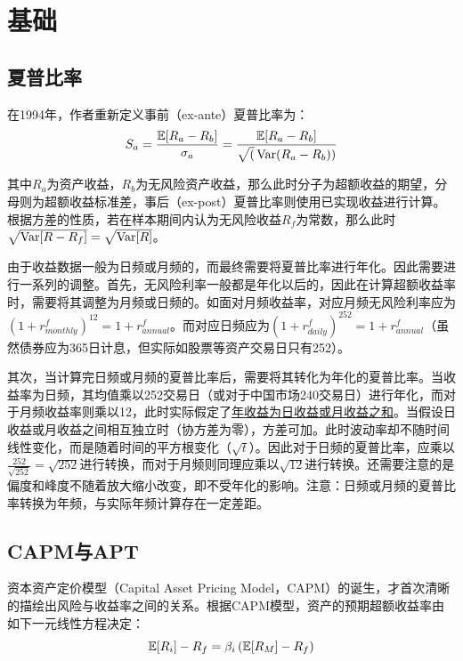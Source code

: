 \documentclass[11pt]{article}
\begin{document}
\maketitle
\tableofcontents

\section{基础}

\subsection{夏普比率}

在1994年，作者重新定义事前（ex-ante）夏普比率为：
\begin{equation*}
    S_a = \frac{\mathbb{E}[R_a-R_b]}{\sigma_a} = \frac{\mathbb{E}[R_a-R_b]}{\sqrt(\operatorname{Var} (R_a - R_b))}
\end{equation*}

其中$R_a$为资产收益，$R_b$为无风险资产收益，那么此时分子为超额收益的期望，分母则为超额收益标准差，事后（ex-post）夏普比率则使用已实现收益进行计算。根据方差的性质，若在样本期间内认为无风险收益$R_f$为常数，那么此时$\sqrt{\operatorname{Var}[R-R_f]} = \sqrt{\operatorname{Var}[R]}$。

由于收益数据一般为日频或月频的，而最终需要将夏普比率进行年化。因此需要进行一系列的调整。首先，无风险利率一般都是年化以后的，因此在计算超额收益率时，需要将其调整为月频或日频的。如面对月频收益率，对应月频无风险利率应为$(1 + r_{monthly}^f)^{12} = 1 + r_{annual}^f$。而对应日频应为$(1 + r_{daily}^f)^{252} = 1 + r_{annual}^f$（虽然债券应为365日计息，但实际如股票等资产交易日只有252）。

其次，当计算完日频或月频的夏普比率后，需要将其转化为年化的夏普比率。当收益率为日频，其均值乘以252交易日（或对于中国市场240交易日）进行年化，而对于月频收益率则乘以12，此时实际假定了\uline{年收益为日收益或月收益之和}。当假设日收益或月收益之间相互独立时（协方差为零），方差可加。此时波动率却不随时间线性变化，而是随着时间的平方根变化（$\sqrt{t}$）。因此对于日频的夏普比率，应乘以$\frac{252}{\sqrt{252}} = \sqrt{252}$进行转换，而对于月频则同理应乘以$\sqrt{12}$进行转换。还需要注意的是偏度和峰度不随着放大缩小改变，即不受年化的影响。注意：日频或月频的夏普比率转换为年频，与实际年频计算存在一定差距。

\subsection{CAPM与APT}

资本资产定价模型（Capital Asset Pricing Model，CAPM）的诞生，才首次清晰的描绘出风险与收益率之间的关系。根据CAPM模型，资产的预期超额收益率由如下一元线性方程决定：
\begin{equation*}
    \mathbb{E}[R_i] - R_f = \beta_i \left( \mathbb{E}[R_M]-R_f \right)
\end{equation*}
\end{document}
